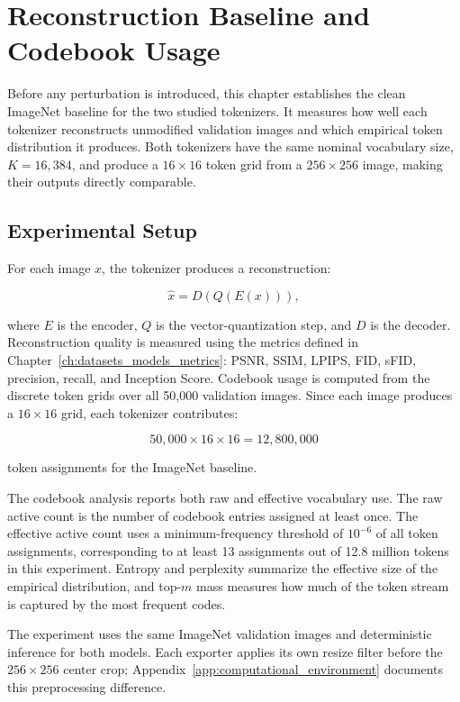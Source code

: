 \chapter{Reconstruction Baseline and Codebook Usage}
\label{ch:rq1}

Before any perturbation is introduced, this chapter establishes the clean
ImageNet baseline for the two studied tokenizers. It measures how well each
tokenizer reconstructs unmodified validation images and which empirical token
distribution it produces. Both tokenizers have the same nominal vocabulary
size, $K=16{,}384$, and produce a $16\times16$ token grid from a
$256\times256$ image, making their outputs directly comparable.

\section{Experimental Setup}
\label{sec:rq1_experimental_setup}

For each image $x$, the tokenizer produces a reconstruction:

\begin{equation}
\hat{x} = D(Q(E(x))),
\end{equation}

where $E$ is the encoder, $Q$ is the vector-quantization step, and $D$ is the decoder. Reconstruction quality is measured using the metrics defined in Chapter~\ref{ch:datasets_models_metrics}: PSNR, SSIM, LPIPS, FID, sFID, precision, recall, and Inception Score. Codebook usage is computed from the discrete token grids over all 50,000 validation images. Since each image produces a $16 \times 16$ grid, each tokenizer contributes:

\begin{equation}
50{,}000 \times 16 \times 16 = 12{,}800{,}000
\end{equation}

token assignments for the ImageNet baseline.

The codebook analysis reports both raw and effective vocabulary use. The raw active count is the number of codebook entries assigned at least once. The effective active count uses a minimum-frequency threshold of $10^{-6}$ of all token assignments, corresponding to at least 13 assignments out of 12.8 million tokens in this experiment. Entropy and perplexity summarize the effective size of the empirical distribution, and top-$m$ mass measures how much of the token stream is captured by the most frequent codes.

The experiment uses the same ImageNet validation images and deterministic
inference for both models. Each exporter applies its own resize filter before
the $256\times256$ center crop; Appendix~\ref{app:computational_environment}
documents this preprocessing difference.

